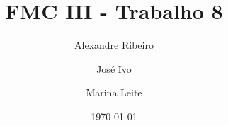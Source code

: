 \documentclass[12pt]{article}
\begin{document}
\title{FMC III - Trabalho 8}
\author{Alexandre Ribeiro \and José Ivo \and Marina Leite}
\date{\today}

\maketitle






\end{document}
